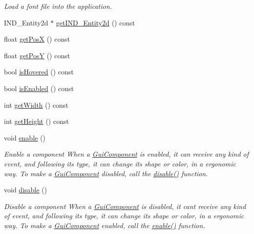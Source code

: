 \begin{DoxyCompactItemize}
\begin{DoxyCompactList}\small\item\em Load a font file into the application. \end{DoxyCompactList}\item 
I\-N\-D\-\_\-\-Entity2d $\ast$ \hyperlink{class_symp_1_1_gui_component_a52ebebf0d3b3c7b6594de11d251fadf4}{get\-I\-N\-D\-\_\-\-Entity2d} () const 
\item 
float \hyperlink{class_symp_1_1_gui_component_a1abb4a355d333f5997d60d7b9f752181}{get\-Pos\-X} () const 
\item 
float \hyperlink{class_symp_1_1_gui_component_ac96015064a38de7a10f8b000fb59f7fe}{get\-Pos\-Y} () const 
\item 
bool \hyperlink{class_symp_1_1_gui_component_ab61bc0870020609f32e0035bbb171305}{is\-Hovered} () const 
\item 
bool \hyperlink{class_symp_1_1_gui_component_a26e2943ad705eac98fbac3bab4a8bb35}{is\-Enabled} () const 
\item 
int \hyperlink{class_symp_1_1_gui_component_a77b9f95708331850e2782b2d1b542ef2}{get\-Width} () const 
\item 
int \hyperlink{class_symp_1_1_gui_component_a4810b7562994b2371fa51a6d8a45203e}{get\-Height} () const 
\item 
void \hyperlink{class_symp_1_1_gui_component_ae3adbc8ba653a8f2d27df10e453df452}{enable} ()
\begin{DoxyCompactList}\small\item\em Enable a component When a \hyperlink{class_symp_1_1_gui_component_a22124675c2976983ac18374f81cc3fb3}{Gui\-Component} is enabled, it can receive any kind of event, and following its type, it can change its shape or color, in a ergonomic way. To make a \hyperlink{class_symp_1_1_gui_component_a22124675c2976983ac18374f81cc3fb3}{Gui\-Component} disabled, call the \hyperlink{class_symp_1_1_gui_component_a1666433de58fd568b568d1d48584802b}{disable()} function. \end{DoxyCompactList}\item 
void \hyperlink{class_symp_1_1_gui_component_a1666433de58fd568b568d1d48584802b}{disable} ()
\begin{DoxyCompactList}\small\item\em Disable a component When a \hyperlink{class_symp_1_1_gui_component_a22124675c2976983ac18374f81cc3fb3}{Gui\-Component} is disabled, it cant receive any kind of event, and following its type, it can change its shape or color, in a ergonomic way. To make a \hyperlink{class_symp_1_1_gui_component_a22124675c2976983ac18374f81cc3fb3}{Gui\-Component} enabled, call the \hyperlink{class_symp_1_1_gui_component_ae3adbc8ba653a8f2d27df10e453df452}{enable()} function. \end{DoxyCompactList}\item 

\end{DoxyCompactItemize}
